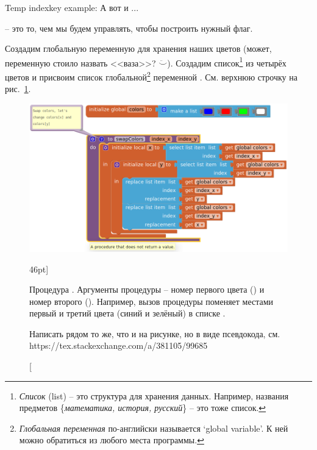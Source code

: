 Temp indexkey example: А вот и ...

 -- это то, чем мы будем управлять, 
чтобы построить нужный флаг. 

Создадим глобальную переменную  для хранения наших цветов 
(может, переменную стоило назвать <<ваза>>? $\ddot\smile$). 
Создадим список\footnote[][-2cm]{\emph{Список} (list) -- это структура для хранения данных. 
Например, названия предметов \{\emph{математика, история, русский}\} -- это тоже список.
} 
из четырёх цветов и присвоим список глобальной\footnote[][-0cm]{\emph{Глобальная переменная} 
по-английски 
называется `global variable'. К ней можно обратиться из любого места программы. 
}
переменной . См. верхнюю строчку на рис.~\ref{fig:block:proc:swap:colors}.

\begin{figure}
  \includegraphics{./graphics/programs/change_flags/proc_swap_colors_2018.png}
    \caption[Процедура .][46pt]{Процедура .
    Аргументы процедуры -- номер первого цвета () 
    и номер второго (). 
    Например, вызов процедуры  поменяет местами первый и 
    третий цвета (синий и зелёный) в списке . 
    
    {\tiny Написать рядом то же, что и на рисунке, но в виде псевдокода, 
    см. https://tex.stackexchange.com/a/381105/99685
    }
    
    }
  \label{fig:block:proc:swap:colors}
\end{figure}

